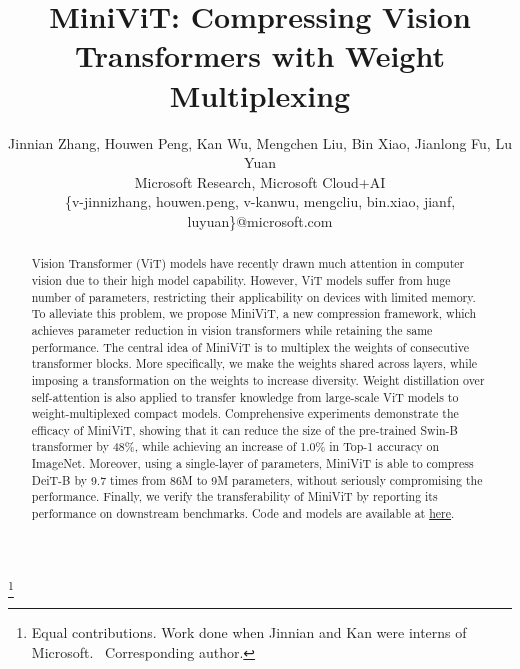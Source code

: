 \documentclass[10pt,twocolumn,letterpaper]{article}
\newcommand\blfootnote[1]{\begingroup 
\renewcommand\thefootnote{}\footnote{#1}\addtocounter{footnote}{-1}\endgroup 
}
\begin{document}
    \setlength{\belowdisplayskip}{7.2pt} \setlength{\belowdisplayshortskip}{7.2pt}
\setlength{\abovedisplayskip}{7.2pt} \setlength{\abovedisplayshortskip}{7.2pt}

    
\title{
    MiniViT: Compressing Vision Transformers with  Weight Multiplexing
    }
 
    \author{Jinnian Zhang, Houwen Peng, Kan Wu, Mengchen Liu, Bin Xiao, Jianlong Fu, Lu Yuan\\ 
     Microsoft Research,   Microsoft Cloud+AI\\
    {\normalsize \{v-jinnizhang, houwen.peng, v-kanwu, mengcliu, bin.xiao, jianf, luyuan\}@microsoft.com}
    }
    \maketitle
    
     
    \blfootnote{
  Equal contributions. Work done when Jinnian and Kan were interns of Microsoft. ~Corresponding author.
 }
 
\vspace{-5mm}
\begin{abstract}
Vision Transformer (ViT) models have recently drawn much attention in computer vision due to their high model capability. However, ViT models suffer from huge number of parameters, restricting their applicability on devices with limited memory. To alleviate this problem, we propose MiniViT, a new compression framework, which achieves parameter reduction in vision transformers while retaining the same performance. The central idea of MiniViT is to multiplex the weights of consecutive transformer blocks. More specifically, we make the weights shared across layers, while imposing a transformation on the weights to increase diversity. Weight distillation over self-attention is also applied to transfer knowledge from large-scale ViT models to weight-multiplexed compact models. Comprehensive experiments demonstrate the efficacy of MiniViT, showing that it can reduce the size of the pre-trained Swin-B transformer by 48\%, while achieving an increase of 1.0\% in Top-1 accuracy on ImageNet. Moreover, using a single-layer of parameters, MiniViT is able to compress DeiT-B by 9.7 times from 86M to 9M parameters, without seriously compromising the performance. Finally, we verify the transferability of MiniViT by reporting its performance on downstream benchmarks. Code and models are available at
\href{https://github.com/microsoft/Cream}{here}.
    \end{abstract}
    
\end{document}
